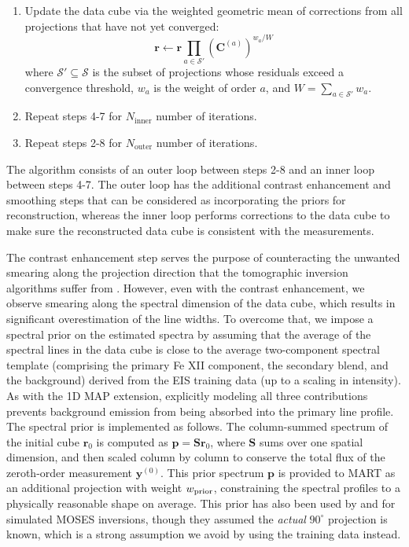 \documentclass[linenumbers,twocolumn]{aastex7}
\begin{document}
\begin{enumerate}
is set to the value at the central wavelength slice to prevent boundary
divergence.
\item Update the data cube via the weighted geometric mean of corrections from
all projections that have not yet converged:
\begin{equation}
    \bm r \leftarrow \bm r \prod_{a \in \mathcal S'} \left(\bm C^{(a)}\right)^{w_a/W}
\end{equation}
where $\mathcal S' \subseteq \mathcal S$ is the subset of projections whose
residuals exceed a convergence threshold, $w_a$ is the weight of order $a$, and
$W = \sum_{a \in \mathcal S'} w_a$.
\item Repeat steps 4-7 for $N_\text{inner}$ number of iterations.
\item Repeat steps 2-8 for $N_\text{outer}$ number of iterations.
\end{enumerate}

The algorithm consists of an outer loop between steps 2-8 and an inner loop
between steps 4-7. The outer loop has the additional contrast enhancement
and smoothing steps that can be considered as incorporating the priors for
reconstruction, whereas the inner loop performs corrections to the data cube to
make sure the reconstructed data cube is consistent with the measurements.


The contrast enhancement step serves the purpose of counteracting the unwanted
smearing along the projection direction that the tomographic inversion
algorithms suffer from \citep{kak2001principles}. However, even with the
contrast enhancement, we observe smearing along the spectral dimension of the
data cube, which results in significant overestimation of the line widths. To
overcome that, we impose a spectral prior on the estimated spectra by assuming
that the average of the spectral lines in the data cube is close to the average
two-component spectral template (comprising the primary Fe XII component, the
secondary blend, and the background) derived from the EIS training data (up to
a scaling in intensity). As with the 1D MAP extension, explicitly modeling all
three contributions prevents background emission from being absorbed into the
primary line profile. The spectral prior is implemented as follows. The column-summed spectrum of the
initial cube $\bm r_0$ is computed as $\bm p = \bm S \bm r_0$, where $\bm S$
sums over one spatial dimension, and then scaled column by column to conserve
the total flux of the zeroth-order measurement $\bm y^{(0)}$. This
prior spectrum $\bm p$ is provided to MART as an additional projection with
weight $w_{\rm prior}$, constraining the spectral profiles to a physically
reasonable shape on average. This prior has also been used by
\citet{fox2003data} and \citet{fox2011snapshot} for simulated MOSES inversions,
though they assumed the \textit{actual} $90^\circ$ projection is known, which
is a strong assumption we avoid by using the training data instead.
\end{document}
